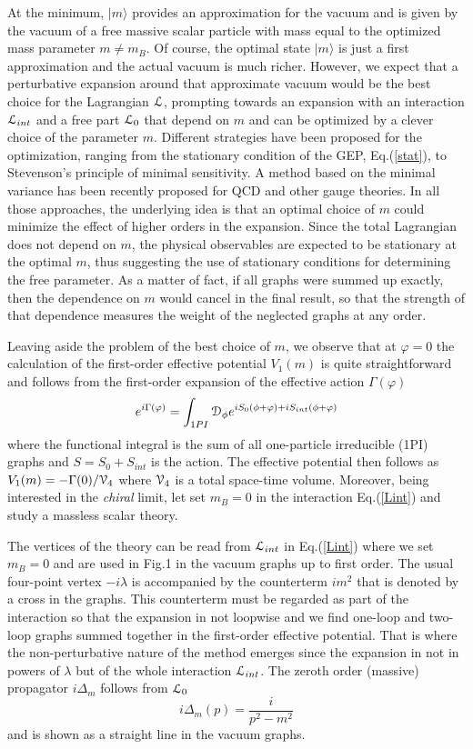 \documentclass[aps,preprint]{revtex4}
\newcommand{\BE}{\begin{equation}}
\newcommand{\EE}{\end{equation}}
\begin{document}
At the minimum, $\vert m\rangle$ provides an approximation for the vacuum and is given by the vacuum of a free
massive scalar particle with mass equal to the optimized mass parameter $m\not=m_B$.
Of course, the optimal state $\vert m\rangle$ is just a first approximation and the actual vacuum is 
much richer. However, we expect that a perturbative expansion around that approximate vacuum would be the
best choice for the Lagrangian ${\cal L}$, prompting towards an expansion with an interaction ${\cal L}_{int}$
and a free part ${\cal L}_0$ that depend on $m$ and can be optimized by a clever choice of the parameter $m$.
Different strategies have been proposed for the optimization, ranging from the stationary condition of the GEP,
Eq.(\ref{stat}), to Stevenson's principle of minimal sensitivity\cite{minimal}. 
A method based on the minimal variance has been recently proposed for QCD and 
other gauge theories\cite{sigma,sigma2,gep2,varqed,varqcd}. In all those approaches, the underlying idea is that
an optimal choice of $m$ could minimize the effect of higher orders in the expansion. Since the total Lagrangian
does not depend on $m$, the physical observables are expected to be stationary at the optimal $m$, thus suggesting
the use of stationary conditions for determining the free parameter. As a matter of fact, 
if all graphs were summed up exactly, then the dependence on $m$ would cancel in the final result, so that the 
strength of that dependence measures the weight of the neglected graphs at any order.

Leaving aside the problem of the best choice of $m$, we observe that at $\varphi=0$ the calculation of
the first-order effective potential $V_1(m)$ is quite straightforward and follows from the first-order expansion of
the effective action $\Gamma(\varphi)$
\BE
e^{i\Gamma(\varphi)}=\int_{1PI} {\cal D}_{\phi} e^{i S_0(\phi+\varphi)+i S_{int}(\phi+\varphi)} 
\EE
where the functional integral is the sum of all one-particle irreducible (1PI) graphs and $S=S_0+S_{int}$
is the action. The effective potential then follows as $V_1(m)=-\Gamma(0)/{\cal V}_4$ where ${\cal V}_4$ is
a total space-time volume. Moreover, being interested in the {\it chiral} limit, let set $m_B=0$ in the
interaction Eq.(\ref{Lint}) and study a massless scalar theory.

The vertices of the theory can be read from ${\cal L}_{int}$ in Eq.(\ref{Lint}) where we set $m_B=0$ 
and are used in Fig.1 in the vacuum graphs up to first order. 
The usual four-point vertex  $-i \lambda$ is accompanied by
the counterterm $i m^2$ that is denoted by a cross in the graphs. This counterterm must be regarded as part of
the interaction so that the expansion in not loopwise and we find one-loop and two-loop graphs summed together in
the first-order effective potential. That is where the non-perturbative nature of the method emerges since the
expansion in not in powers of $\lambda$ but of the whole interaction ${\cal L}_{int}$.
The zeroth order (massive) propagator $ i \Delta_m$ follows from ${\cal L}_0$ 
\BE
i \Delta_m (p)=\frac{i}{p^2-m^2}
\EE
and is shown as a straight line in the vacuum graphs.
\end{document}
